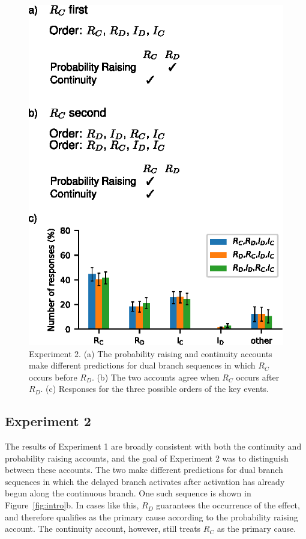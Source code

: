 \documentclass[10pt,letterpaper]{article}
\newcommand{\ev}[2]{$#1_#2$}
\begin{document}
\begin{figure}[t]
\begin{center}
\includegraphics{figures/expt2test.eps}
\end{center}
\caption{Experiment 2. (a) The probability raising and continuity accounts make different predictions for dual branch sequences in which \ev{R}{C} occurs before \ev{R}{D}. (b) The two accounts agree when \ev{R}{C} occurs after \ev{R}{D}.
(c) Responses for the three possible orders of the key events.} 
\label{fig:expt2}
\end{figure}



\subsection{Experiment 2}

The results of Experiment 1 are broadly consistent with both the continuity and probability raising accounts, and the goal of Experiment 2 was to distinguish between these accounts. The two make different predictions for dual branch sequences in which the delayed branch activates after activation has already begun along the continuous branch. One such sequence is shown in Figure~\ref{fig:intro}b. 
In cases like this, \ev{R}{D} guarantees the occurrence of the effect, and therefore qualifies as the primary cause according to the probability raising account. The continuity account, however, still treats \ev{R}{C} as the primary cause.
\end{document}
